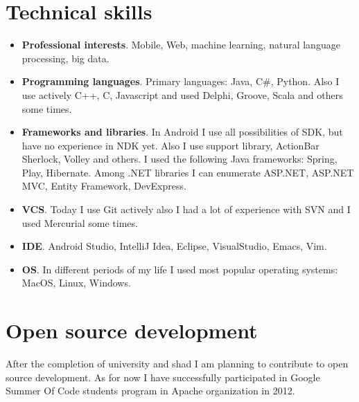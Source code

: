 \documentclass{article}
\begin{document}
\section*{Technical skills}

\begin{itemize}
\item \textbf{Professional interests}. Mobile, Web, machine learning, natural language processing, big data.
\item \textbf{Programming languages}. Primary languages: Java, C\#, Python. Also I use actively C++, C, Javascript and used Delphi, Groove, Scala and others some times.
\item \textbf{Frameworks and libraries}. In Android I use all possibilities of SDK, but have no experience in NDK yet. Also I use support library, ActionBar Sherlock, Volley and others. I used the following Java frameworks: Spring, Play, Hibernate. Among .NET libraries I can enumerate ASP.NET, ASP.NET MVC, Entity Framework, DevExpress.
\item \textbf{VCS}. Today I use Git actively also I had a lot of experience with SVN and I used Mercurial some times.
\item \textbf{IDE}. Android Studio, IntelliJ Idea, Eclipse, VisualStudio, Emacs, Vim.
\item \textbf{OS}. In different periods of my life I used most popular operating systems: MacOS, Linux, Windows.
\end{itemize}

\section*{Open source development}
After the completion of university and shad I am planning to contribute to open source development. As for now I have successfully participated in Google Summer Of Code students program in Apache organization in 2012. 
\end{document}
